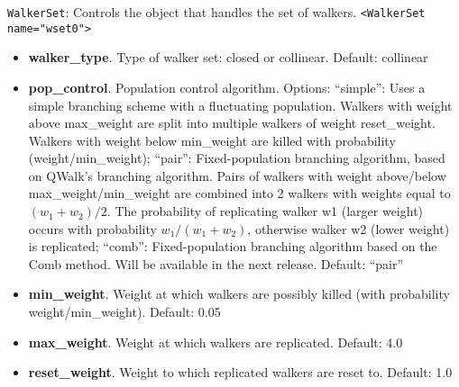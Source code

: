 \texttt{WalkerSet}: Controls the object that handles the set of walkers.
\texttt{<WalkerSet name="wset0">}
\begin{itemize}
\item \textbf{walker\_type}. Type of walker set: closed or collinear. 
      Default: collinear
\item \textbf{pop\_control}. Population control algorithm. Options: ``simple'': Uses a simple branching scheme with a fluctuating population. Walkers with weight above max\_weight are split into multiple walkers of weight reset\_weight. Walkers with weight below min\_weight are killed with probability (weight/min\_weight); ``pair'': Fixed-population branching algorithm, based on QWalk's branching algorithm. Pairs of walkers with weight above/below max\_weight/min\_weight are combined into 2 walkers with weights equal to $(w_1+w_2)/2$. The probability of replicating walker w1 (larger weight) occurs with probability $w_1/(w_1+w_2)$, otherwise walker w2 (lower weight) is replicated; ``comb'': Fixed-population branching algorithm based on the Comb method. Will be available in the next release. Default: ``pair''
\item \textbf{min\_weight}. Weight at which walkers are possibly killed (with probability weight/min\_weight). Default: 0.05
\item \textbf{max\_weight}. Weight at which walkers are replicated. Default: 4.0
\item \textbf{reset\_weight}. Weight to which replicated walkers are reset to. Default: 1.0
\end{itemize}

